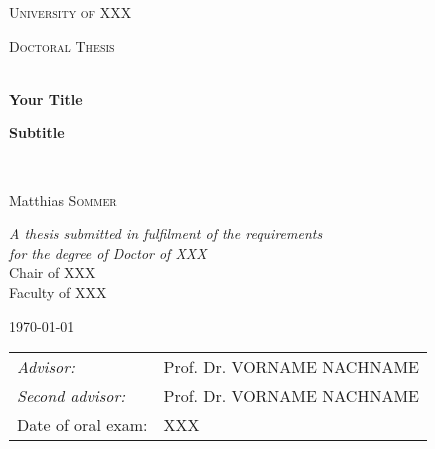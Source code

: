 \frontmatter
\pagestyle{plain}

\begin{titlepage}
	\begin{center}
		
		\vspace*{.06\textheight}
		
		{\scshape\LARGE University of XXX\par}\vspace{1.5cm} %
		
		\textsc{\Large Doctoral Thesis}\\[0.5cm] %
		
		
		\HRule \\[0.4cm] %
		
		{\huge \bfseries Your Title\par}
		{\Large \bfseries Subtitle\par}
		
		\vspace{0.4cm} %
		\HRule \\[1.5cm] %
		
		
		{\Large	Matthias \textsc{Sommer}\par}
		\vspace{2cm}

		\vfill
		
		\large \textit{A thesis submitted in fulfilment of the requirements\\ for the degree of Doctor of XXX}\\[0.7cm] %

		Chair of XXX\\Faculty of XXX\\[1cm] %
		
		\vfill	
		
		{\large \today}\\[4cm] %
		
		\vfill
	\end{center}	
\end{titlepage}

			
\begin{tabular}{ll}
	\emph{Advisor: } 	& Prof. Dr. VORNAME \textsc{NACHNAME}\\ %
	\emph{Second advisor: } & Prof. Dr. VORNAME \textsc{NACHNAME}\\
	
	Date of oral exam: & XXX
	
\end{tabular}\\[2cm]
\cleardoublepage